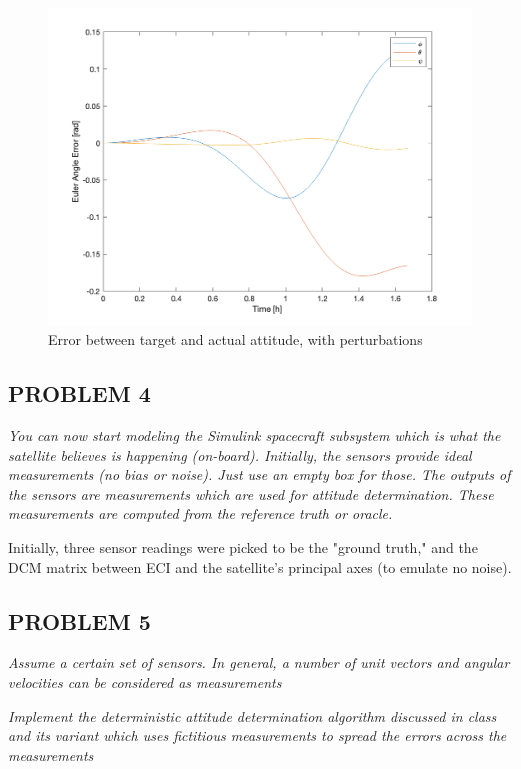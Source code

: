 \begin{figure}[H]
\centering
\includegraphics[scale=0.6]{Images/ps6_problem3_error.png}
\caption{Error between target and actual attitude, with perturbations}
\label{fig:Images/ps6_problem3_error}
\end{figure}

\subsection{PROBLEM 4}
\textit{You can now start modeling the Simulink spacecraft subsystem which is what the satellite believes is happening (on-board). Initially, the sensors provide ideal measurements (no bias or noise). Just use an empty box for those. The outputs of the sensors are measurements which are used for attitude determination. These measurements are computed from the reference truth or oracle.}

Initially, three sensor readings were picked to be the "ground truth," and the DCM matrix between ECI and the satellite's principal axes (to emulate no noise).

\subsection{PROBLEM 5}
\textit{Assume a certain set of sensors. In general, a number of unit vectors and angular velocities can be considered as measurements}

\textit{Implement the deterministic attitude determination algorithm discussed in class and its variant which uses fictitious measurements to spread the errors across the measurements}

